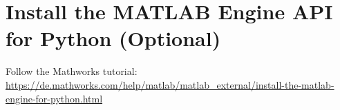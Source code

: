 \section{Install the MATLAB Engine API for Python (Optional)}
Follow the Mathworks tutorial: \url{https://de.mathworks.com/help/matlab/matlab_external/install-the-matlab-engine-for-python.html}

